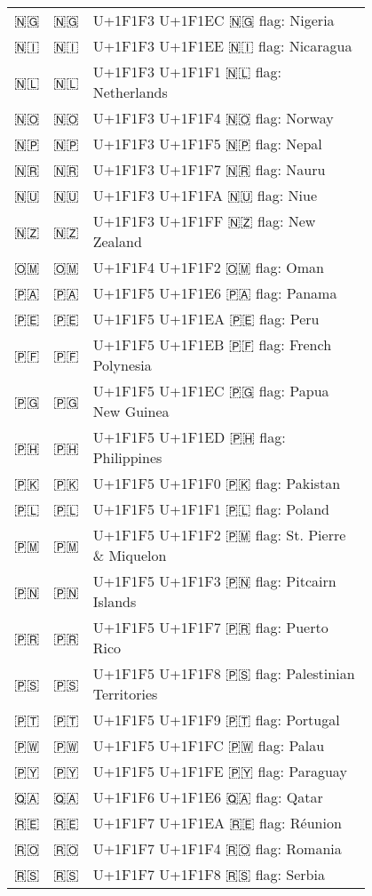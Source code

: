 \documentclass[a4paper,12pt]{ltjarticle}
\newcommand{\fontA}[1]{{\fontspec[RawFeature={mode=harf,+dist,+ccmp}]{Segoe UI Emoji} #1}}
\newcommand{\fontB}[1]{{\fontspec[RawFeature={mode=harf,+dist,+ccmp}]{Noto Color Emoji} #1}}
\begin{document}
\begin{longtable}[c]{ccp{0.8\linewidth}}
\fontA{🇳🇬}&\fontB{🇳🇬}&U+1F1F3 U+1F1EC 🇳🇬 flag: Nigeria\\
\fontA{🇳🇮}&\fontB{🇳🇮}&U+1F1F3 U+1F1EE 🇳🇮 flag: Nicaragua\\
\fontA{🇳🇱}&\fontB{🇳🇱}&U+1F1F3 U+1F1F1 🇳🇱 flag: Netherlands\\
\fontA{🇳🇴}&\fontB{🇳🇴}&U+1F1F3 U+1F1F4 🇳🇴 flag: Norway\\
\fontA{🇳🇵}&\fontB{🇳🇵}&U+1F1F3 U+1F1F5 🇳🇵 flag: Nepal\\
\fontA{🇳🇷}&\fontB{🇳🇷}&U+1F1F3 U+1F1F7 🇳🇷 flag: Nauru\\
\fontA{🇳🇺}&\fontB{🇳🇺}&U+1F1F3 U+1F1FA 🇳🇺 flag: Niue\\
\fontA{🇳🇿}&\fontB{🇳🇿}&U+1F1F3 U+1F1FF 🇳🇿 flag: New Zealand\\
\fontA{🇴🇲}&\fontB{🇴🇲}&U+1F1F4 U+1F1F2 🇴🇲 flag: Oman\\
\fontA{🇵🇦}&\fontB{🇵🇦}&U+1F1F5 U+1F1E6 🇵🇦 flag: Panama\\
\fontA{🇵🇪}&\fontB{🇵🇪}&U+1F1F5 U+1F1EA 🇵🇪 flag: Peru\\
\fontA{🇵🇫}&\fontB{🇵🇫}&U+1F1F5 U+1F1EB 🇵🇫 flag: French Polynesia\\
\fontA{🇵🇬}&\fontB{🇵🇬}&U+1F1F5 U+1F1EC 🇵🇬 flag: Papua New Guinea\\
\fontA{🇵🇭}&\fontB{🇵🇭}&U+1F1F5 U+1F1ED 🇵🇭 flag: Philippines\\
\fontA{🇵🇰}&\fontB{🇵🇰}&U+1F1F5 U+1F1F0 🇵🇰 flag: Pakistan\\
\fontA{🇵🇱}&\fontB{🇵🇱}&U+1F1F5 U+1F1F1 🇵🇱 flag: Poland\\
\fontA{🇵🇲}&\fontB{🇵🇲}&U+1F1F5 U+1F1F2 🇵🇲 flag: St. Pierre \& Miquelon\\
\fontA{🇵🇳}&\fontB{🇵🇳}&U+1F1F5 U+1F1F3 🇵🇳 flag: Pitcairn Islands\\
\fontA{🇵🇷}&\fontB{🇵🇷}&U+1F1F5 U+1F1F7 🇵🇷 flag: Puerto Rico\\
\fontA{🇵🇸}&\fontB{🇵🇸}&U+1F1F5 U+1F1F8 🇵🇸 flag: Palestinian Territories\\
\fontA{🇵🇹}&\fontB{🇵🇹}&U+1F1F5 U+1F1F9 🇵🇹 flag: Portugal\\
\fontA{🇵🇼}&\fontB{🇵🇼}&U+1F1F5 U+1F1FC 🇵🇼 flag: Palau\\
\fontA{🇵🇾}&\fontB{🇵🇾}&U+1F1F5 U+1F1FE 🇵🇾 flag: Paraguay\\
\fontA{🇶🇦}&\fontB{🇶🇦}&U+1F1F6 U+1F1E6 🇶🇦 flag: Qatar\\
\fontA{🇷🇪}&\fontB{🇷🇪}&U+1F1F7 U+1F1EA 🇷🇪 flag: Réunion\\
\fontA{🇷🇴}&\fontB{🇷🇴}&U+1F1F7 U+1F1F4 🇷🇴 flag: Romania\\
\fontA{🇷🇸}&\fontB{🇷🇸}&U+1F1F7 U+1F1F8 🇷🇸 flag: Serbia\\

\end{longtable}
\end{document}
